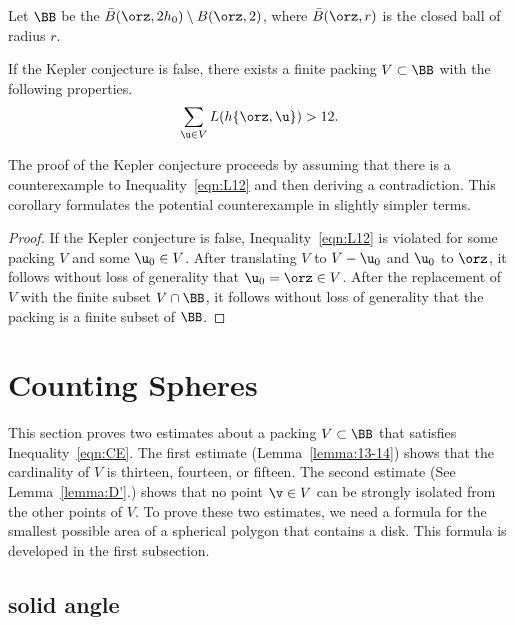 \begin{definition}[$\BB$] 
   Let $\BB$ be the 
  $\bar B(\orz,2h_0)\setminus B(\orz,2)$, where $\bar B(\orz,r)$ is
  the closed ball of radius $r$.  
\end{definition}
%


\begin{corollary}\label{cor:CE} 
  If the Kepler conjecture is false, there exists a finite packing
  $V\subset\BB$ with the following properties.
\begin{equation}\label{eqn:CE} 
\sum_{ \u\in V} L(h\{\orz, \u\}) > 12.
\end{equation}
\end{corollary}

The proof of the Kepler conjecture proceeds by assuming that there is
a counterexample to Inequality~\ref{eqn:L12} and then deriving a
contradiction.  This corollary formulates the potential counterexample
in slightly simpler terms.

\begin{proof} If the Kepler conjecture is false,
  Inequality~\ref{eqn:L12} is violated for some packing $ V$ and some
  $ \u_0\in V$.  After translating  $ V$ to $ V - \u_0$ and $
  \u_0$ to $\orz$, it follows without loss of generality that $
  \u_0=\orz\in V$.  After the replacement of $ V$ with the finite
  subset $V\cap \BB$, it follows without loss of generality that the
  packing is a finite subset of $\BB$.
\end{proof}



\section{Counting Spheres}

This section proves two estimates about a packing $V\subset \BB$ that
satisfies Inequality~\ref{eqn:CE}.  The first estimate
(Lemma~\ref{lemma:13-14}) shows that the cardinality of $V$ is
thirteen, fourteen, or fifteen.  The second estimate (See
Lemma~\ref{lemma:D'}.)  shows that no point $\v\in V$ can be strongly
isolated from the other points of $V$.  To prove these two estimates,
we need a formula for the smallest possible area of a spherical
polygon that contains a disk.  This formula is developed in the first
subsection.

\subsection{solid angle}
%


